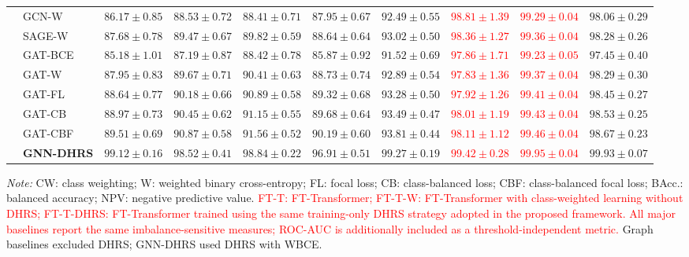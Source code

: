 \documentclass[pdflatex,sn-mathphys-num]{sn-jnl}%
\theoremstyle{thmstyleone}%
\theoremstyle{thmstyletwo}%
\theoremstyle{thmstylethree}%
\begin{document}
\begin{table}[!ht]
{\begin{tabular}{@{}llcccccccc@{}}
\addlinespace[1pt]

& GCN-W
& $86.17\pm0.85$
& $88.53\pm0.72$
& $88.41\pm0.71$
& $87.95\pm0.67$
& $92.49\pm0.55$
& \textcolor{red}{$98.81\pm1.39$}
& \textcolor{red}{$99.29\pm0.04$}
& $98.06\pm0.29$ \\

& SAGE-W
& $87.68\pm0.78$
& $89.47\pm0.67$
& $89.82\pm0.59$
& $88.64\pm0.64$
& $93.02\pm0.50$
& \textcolor{red}{$98.36\pm1.27$}
& \textcolor{red}{$99.36\pm0.04$}
& $98.28\pm0.26$ \\

\addlinespace[1pt]

& GAT-BCE
& $85.18\pm1.01$
& $87.19\pm0.87$
& $88.42\pm0.78$
& $85.87\pm0.92$
& $91.52\pm0.69$
& \textcolor{red}{$97.86\pm1.71$}
& \textcolor{red}{$99.23\pm0.05$}
& $97.45\pm0.40$ \\

& GAT-W
& $87.95\pm0.83$
& $89.67\pm0.71$
& $90.41\pm0.63$
& $88.73\pm0.74$
& $92.89\pm0.54$
& \textcolor{red}{$97.83\pm1.36$}
& \textcolor{red}{$99.37\pm0.04$}
& $98.29\pm0.30$ \\

& GAT-FL
& $88.64\pm0.77$
& $90.18\pm0.66$
& $90.89\pm0.58$
& $89.32\pm0.68$
& $93.28\pm0.50$
& \textcolor{red}{$97.92\pm1.26$}
& \textcolor{red}{$99.41\pm0.04$}
& $98.45\pm0.27$ \\

& GAT-CB
& $88.97\pm0.73$
& $90.45\pm0.62$
& $91.15\pm0.55$
& $89.68\pm0.64$
& $93.49\pm0.47$
& \textcolor{red}{$98.01\pm1.19$}
& \textcolor{red}{$99.43\pm0.04$}
& $98.53\pm0.25$ \\

& GAT-CBF
& $89.51\pm0.69$
& $90.87\pm0.58$
& $91.56\pm0.52$
& $90.19\pm0.60$
& $93.81\pm0.44$
& \textcolor{red}{$98.11\pm1.12$}
& \textcolor{red}{$99.46\pm0.04$}
& $98.67\pm0.23$ \\

& \textbf{GNN-DHRS}
& \textbf{$99.12\pm0.16$}
& \textbf{$98.52\pm0.41$}
& \textbf{$98.84\pm0.22$}
& \textbf{$96.91\pm0.51$}
& \textbf{$99.27\pm0.19$}
& \textcolor{red}{\textbf{$99.42\pm0.28$}}
& \textcolor{red}{\textbf{$99.95\pm0.04$}}
& \textbf{$99.93\pm0.07$} \\

\bottomrule
\end{tabular}%
}

\vspace{2pt}
\begin{minipage}{0.98\textwidth}
\footnotesize
\textit{Note:}
CW: class weighting;
W: weighted binary cross-entropy;
FL: focal loss;
CB: class-balanced loss;
CBF: class-balanced focal loss;
BAcc.: balanced accuracy;
NPV: negative predictive value.
\textcolor{red}{
FT-T: FT-Transformer;
FT-T-W: FT-Transformer with class-weighted learning without DHRS;
FT-T-DHRS: FT-Transformer trained using the same training-only DHRS strategy
adopted in the proposed framework.
}
\textcolor{red}{
All major baselines report the same imbalance-sensitive measures;
ROC-AUC is additionally included as a threshold-independent metric.
}
Graph baselines excluded DHRS; GNN-DHRS used DHRS with WBCE.
\end{minipage}


\end{table}
\end{document}
